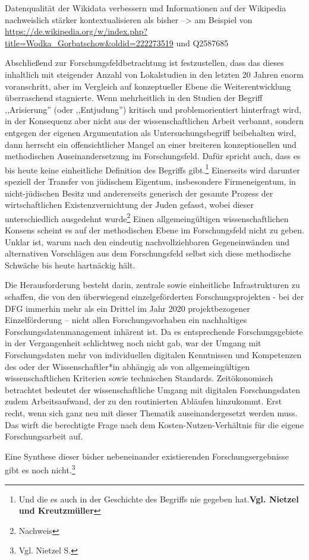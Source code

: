 Datenqualität der Wikidata verbessern und Informationen auf der Wikipedia nachweislich stärker kontextualisieren als bisher
--> am Beispiel von \url{https://de.wikipedia.org/w/index.php?title=Wodka_Gorbatschow&oldid=222273519} und Q2587685

Abschließend zur Forschungsfeldbetrachtung ist festzustellen, dass das dieses inhaltlich mit steigender Anzahl von Lokalstudien in den letzten 20 Jahren enorm voranschritt, aber im Vergleich auf konzeptueller Ebene die Weiterentwicklung überraschend stagnierte. Wenn mehrheitlich in den Studien der Begriff ,,Arisierung'' (oder ,,Entjudung'') kritisch und problemorientiert hinterfragt wird, in der Konsequenz aber nicht aus der wissenschaftlichen Arbeit verbannt, sondern entgegen der eigenen Argumentation als Untersuchungsbegriff beibehalten wird, dann herrscht ein offensichtlicher Mangel an einer breiteren konzeptionellen und methodischen Auseinandersetzung im Forschungsfeld. Dafür spricht auch, dass es bis heute keine einheitliche Definition des Begriffs gibt.\footnote{Und die es auch in der Geschichte des Begriffs nie gegeben hat.\textbf{Vgl. Nietzel und Kreutzmüller}} Einerseits wird darunter speziell der Transfer von jüdischem Eigentum, insbesondere Firmeneigentum, in nicht-jüdischen Besitz und andererseits generisch der gesamte Prozess der wirtschaftlichen Existenzvernichtung der Juden gefasst, wobei dieser unterschiedlich ausgedehnt wurde\footnote{Nachweis} Einen allgemeingültigen wissenschaftlichen Konsens scheint es auf der methodischen Ebene im Forschungsfeld nicht zu geben. Unklar ist, warum nach den eindeutig nachvollziehbaren Gegeneinwänden und alternativen Vorschlägen aus dem Forschungsfeld selbst sich diese methodische Schwäche bis heute hartnäckig hält.


Die Herausforderung besteht darin, zentrale sowie einheitliche Infrastrukturen zu schaffen, die von den überwiegend einzelgeförderten Forschungsprojekten - bei der DFG immerhin mehr als ein Drittel im Jahr 2020 projektbezogener Einzelförderung – nicht allen Forschungsvorhaben ein nachhaltiges Forschungsdatenmanagement inhärent ist. Da es entsprechende Forschungsgebiete in der Vergangenheit schlichtweg noch nicht gab, war der Umgang mit Forschungsdaten mehr von individuellen digitalen Kenntnissen und Kompetenzen des oder der Wissenschaftler*in abhängig als von allgemeingültigen wissenschaftlichen Kriterien sowie technischen Standards. Zeitökonomisch betrachtet bedeutet der wissenschaftliche Umgang mit digitalen Forschungsdaten zudem Arbeitsaufwand, der zu den routinierten Abläufen hinzukommt. Erst recht, wenn sich ganz neu mit dieser Thematik auseinandergesetzt werden muss. Das wirft die berechtigte Frage nach dem Kosten-Nutzen-Verhältnis für die eigene Forschungsarbeit auf.

Eine Synthese dieser bisher nebeneinander existierenden Forschungsergebnisse gibt es noch nicht.\footnote{Vgl. Nietzel S.}